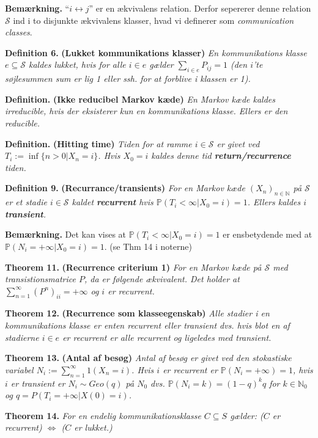 \documentclass[a4paper,10pt,openany]{book}
\begin{document}
\textbf{Bemærkning.} ``\(i\longleftrightarrow j\)'' er en ækvivalens relation. Derfor sepererer denne relation \(\mathcal{S}\) ind i to disjunkte ækvivalens klasser, hvad vi definerer som \emph{communication classes}.

\textbf{Definition 6.} \textbf{(Lukket kommunikations klasser)} \emph{En kommunikations klasse \(e\subseteq \mathcal{S}\) kaldes lukket, hvis for alle \(i\in e\) gælder \(\sum_{i\in e}P_{ij}=1\) (den \(i\)'te søjlesummen sum er lig 1 eller ssh. for at forblive i klassen er 1).}

\textbf{Definition.} \textbf{(Ikke reducibel Markov kæde)} \emph{En Markov kæde kaldes irreducible, hvis der eksisterer kun en kommunikations klasse. Ellers er den reducible.}

\textbf{Definition.} \textbf{(Hitting time)} \emph{Tiden for at ramme \(i\in \mathcal{S}\) er givet ved \(T_i:=\inf\{n>0 \vert X_n=i\}\). Hvis \(X_0=i\) kaldes denne tid \textbf{return/recurrence} tiden.}

\textbf{Definition 9.} \textbf{(Recurrance/transients)} \emph{For en Markov kæde \((X_n)_{n\in\mathbb{N}}\) på \(\mathcal{S}\) er et stadie \(i\in\mathcal{S}\) kaldet \textbf{recurrent} hvis \(\mathbb{P}(T_i<\infty \vert X_0=i)=1\). Ellers kaldes \(i\) \textbf{transient}.}

\textbf{Bemærkning.} Det kan vises at \(\mathbb{P}(T_i<\infty \vert X_0=i)=1\) er ensbetydende med at \(\mathbb{P}(N_i=+\infty \vert X_0=i)=1\). (se Thm 14 i noterne)

\textbf{Theorem 11.} \textbf{(Recurrence criterium 1)} \emph{For en Markov kæde på \(\mathcal{S}\) med transistionsmatrice \(P\), da er følgende ækvivalent. Det holder at \(\sum_{n=1}^\infty (P^n)_{ii}=+\infty\) og \(i\) er recurrent.}

\textbf{Theorem 12.} \textbf{(Recurrence som klasseegenskab)} \emph{Alle stadier i en kommunikations klasse er enten recurrent eller transient dvs. hvis blot en af stadierne \(i\in e\) er recurrent er alle recurrent og ligeledes med transient.}

\textbf{Theorem 13.} \textbf{(Antal af besøg)} \emph{Antal af besøg er givet ved den stokastiske variabel \(N_i:=\sum_{n=1}^\infty 1(X_n=i)\). Hvis \(i\) er recurrent er \(\mathbb{P}(N_i=+\infty)=1\), hvis \(i\) er transient er \(N_i\sim Geo(q)\) på \(N_0\) dvs. \(\mathbb{P}(N_i=k)=(1-q)^kq\) for \(k\in\mathbb{N}_0\) og \(q=P(T_i=+\infty\vert X(0)=i)\).}

\textbf{Theorem 14.} \emph{For en endelig kommunikationsklasse \(C\subseteq S\) gælder: (\(C\) er recurrent) \(\Leftrightarrow\) (\(C\) er lukket.)}
\end{document}
